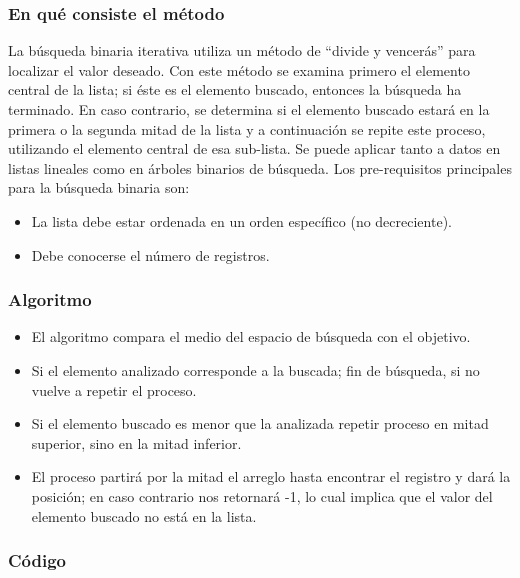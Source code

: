 \subsubsection{En qué consiste el método}

La búsqueda binaria iterativa utiliza un método de “divide y vencerás” para localizar el valor deseado. Con este método se examina primero el elemento central de la lista; si éste es el elemento buscado, entonces la búsqueda ha terminado. En caso contrario, se determina si el elemento buscado estará en la primera o la segunda mitad de la lista y a continuación se repite este proceso, utilizando el elemento central de esa sub-lista. Se puede aplicar tanto a datos en listas lineales como en árboles binarios de búsqueda. Los pre-requisitos principales para la búsqueda binaria son: 

\begin{itemize}
\item La lista debe estar ordenada en un orden específico (no decreciente).
\item Debe conocerse el número de registros.
\end{itemize}

\subsubsection{Algoritmo}

\begin{itemize}
\item El algoritmo compara el medio del espacio de búsqueda con el objetivo.
\item Si el elemento analizado corresponde a la buscada; fin de búsqueda, si no vuelve a repetir el proceso. 
\item Si el elemento buscado es menor que la analizada repetir proceso en mitad superior, sino en la mitad inferior. 
\item El proceso partirá por la mitad el arreglo hasta encontrar el registro y dará la posición; en caso contrario nos retornará -1, lo cual implica que el valor del elemento buscado no está en la lista.
\end{itemize}

\subsubsection{Código}

